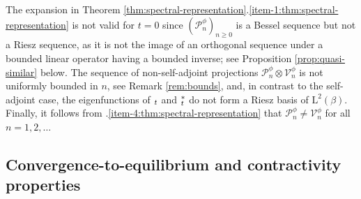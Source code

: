 \documentclass[11pt]{article}
\makeatletter
\numberwithin{equation}{section}
\DeclareRobustCommand{\mathds}[1]{\csname jepbb@#1\endcsname}
\theoremstyle{plain}
\theoremstyle{definition}
\renewcommand{\P}{\mathcal{P}}
\newcommand{\V}{\mathcal{V}}
\newcommand{\J}{\mathds{Q}}
\newcommand{\Leb}{\mathrm{L}}
\let\bpsi\beta
\makeatother
\begin{document}
The expansion in Theorem \ref{thm:spectral-representation}.\eqref{item-1:thm:spectral-representation} is not valid for $t =0$ since $(\P_n^\phi)_{n \geq 0}$ is a Bessel sequence but not a Riesz sequence, as it is not the image of an orthogonal sequence under a bounded linear operator having a bounded inverse; see Proposition \ref{prop:quasi-similar} below. The sequence of non-self-adjoint projections $\P_n^\phi \otimes \V_n^\phi$ is not uniformly bounded in $n$, see Remark \ref{rem:bounds}, and, in contrast to the self-adjoint case, the eigenfunctions of $\J_t$ and $\J_t^*$ do not form a Riesz basis of $\Leb^2(\bpsi)$. Finally, it follows from .\eqref{item-4:thm:spectral-representation} that $\P_n^\phi \neq \V_n^\phi$ for all $n = 1,2,\ldots$

\subsection{Convergence-to-equilibrium and contractivity properties}
\end{document}
